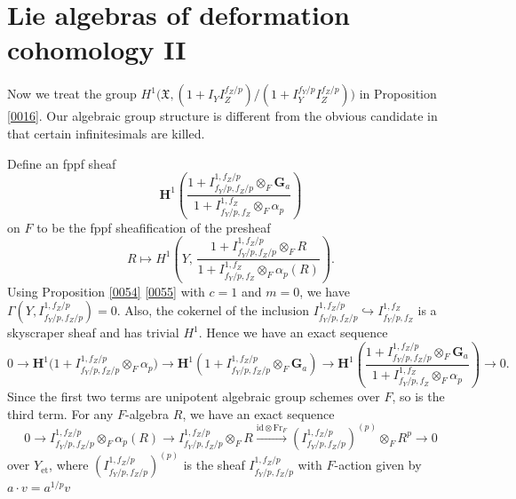 \documentclass{amsart}
\theoremstyle{remark}
\numberwithin{equation}{section}
\newcommand{\into}{\hookrightarrow}
\newcommand{\tensor}{\mathbin{\otimes}}
\newcommand{\et}{\mathrm{et}}
\newcommand{\id}{\mathrm{id}}
\newcommand{\Ga}{\mathbf{G}_{a}}
\newcommand{\alg}[1]{\mathbf{#1}}
\newcommand{\Frob}{\mathrm{Fr}}
\begin{document}

\section{Lie algebras of deformation cohomology II}
\label{0037}

Now we treat the group
$H^{1} \bigl( \mathfrak{X}, (1 + I_{Y} I_{Z}^{f_{Z} / p}) / (1 + I_{Y}^{f_{Y} / p} I_{Z}^{f_{Z} / p}) \bigr)$
in Proposition \ref{0016}.
Our algebraic group structure is different from the obvious candidate
in that certain infinitesimals are killed.

Define an fppf sheaf
	\begin{equation} \label{0011}
		\alg{H}^{1} \left(
			\frac{
				1 + I^{1, f_{Z} / p}_{f_{Y} / p, f_{Z} / p} \tensor_{F} \Ga
			}{
				1 + I^{1, f_{Z}}_{f_{Y} / p, f_{Z}} \tensor_{F} \alpha_{p}
			}
		\right)
	\end{equation}
on $F$ to be the fppf sheafification of the presheaf
	\[
			R
		\mapsto
		H^{1} \left(
			Y,\,
			\frac{
				1 + I^{1, f_{Z} / p}_{f_{Y} / p, f_{Z} / p} \tensor_{F} R
			}{
				1 + I^{1, f_{Z}}_{f_{Y} / p, f_{Z}} \tensor_{F} \alpha_{p}(R)
			}
		\right).
	\]
Using Proposition \ref{0054} \eqref{0055}
with $c = 1$ and $m = 0$,
we have $\Gamma(Y, I^{1, f_{Z} / p}_{f_{Y} / p, f_{Z} / p}) = 0$.
Also, the cokernel of the inclusion
$I^{1, f_{Z} / p}_{f_{Y} / p, f_{Z} / p} \into I^{1, f_{Z}}_{f_{Y} / p, f_{Z}}$
is a skyscraper sheaf and has trivial $H^{1}$.
Hence we have an exact sequence
	\[
			0
		\to
			\alg{H}^{1} \bigl(
				1 + I^{1, f_{Z} / p}_{f_{Y} / p, f_{Z} / p} \tensor_{F} \alpha_{p}
			\bigr)
		\to
			\alg{H}^{1}(
				1 + I^{1, f_{Z} / p}_{f_{Y} / p, f_{Z} / p} \tensor_{F} \Ga
			)
		\to
			\alg{H}^{1} \left(
				\frac{
					1 + I^{1, f_{Z} / p}_{f_{Y} / p, f_{Z} / p} \tensor_{F} \Ga
				}{
					1 + I^{1, f_{Z}}_{f_{Y} / p, f_{Z}} \tensor_{F} \alpha_{p}
				}
			\right)
		\to
			0.
	\]
Since the first two terms are unipotent algebraic group schemes over $F$,
so is the third term.
For any $F$-algebra $R$,
we have an exact sequence
	\[
			0
		\to
			I^{1, f_{Z} / p}_{f_{Y} / p, f_{Z} / p} \tensor_{F} \alpha_{p}(R)
		\to
			I^{1, f_{Z} / p}_{f_{Y} / p, f_{Z} / p} \tensor_{F} R
		\stackrel{\id \tensor \Frob_{F}}{\to}
			(I^{1, f_{Z} / p}_{f_{Y} / p, f_{Z} / p})^{(p)} \tensor_{F} R^{p}
		\to
			0
	\]
over $Y_{\et}$,
where $(I^{1, f_{Z} / p}_{f_{Y} / p, f_{Z} / p})^{(p)}$ is
the sheaf $I^{1, f_{Z} / p}_{f_{Y} / p, f_{Z} / p}$
with $F$-action given by $a \cdot v = a^{1 / p} v$
\end{document}
